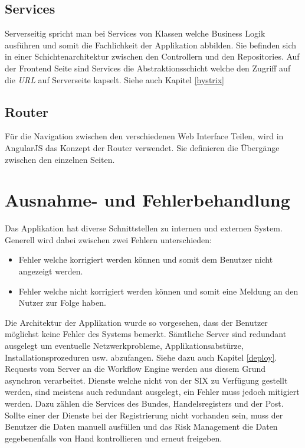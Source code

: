 \subsection{Services}

Serverseitig spricht man bei Services von Klassen welche Business Logik ausführen und somit die Fachlichkeit der Applikation abbilden. Sie befinden sich in einer Schichtenarchitektur zwischen den Controllern und den Repositories. Auf der Frontend Seite sind Services die Abstraktionsschicht welche den Zugriff auf die \textit{\gls{URL}} auf Serverseite kapselt. Siehe auch Kapitel \ref{hystrix}

\subsection{Router}

Für die Navigation zwischen den verschiedenen Web Interface Teilen, wird in AngularJS das Konzept der Router verwendet. Sie definieren die Übergänge zwischen den einzelnen Seiten.
\newpage
\section{Ausnahme- und Fehlerbehandlung}

Das Applikation hat diverse Schnittstellen zu internen und externen System. Generell wird dabei zwischen zwei Fehlern unterschieden:
\begin{itemize}
	\item Fehler welche korrigiert werden können und somit dem Benutzer nicht angezeigt werden.
	\item Fehler welche nicht korrigiert werden können und somit eine Meldung an den Nutzer zur Folge haben.
\end{itemize}
Die Architektur der Applikation wurde so vorgesehen, dass der Benutzer möglichst keine Fehler des Systems bemerkt. Sämtliche Server sind redundant ausgelegt um eventuelle Netzwerkprobleme, Applikationsabstürze, Installationsprozeduren usw. abzufangen. Siehe dazu auch Kapitel \ref{deploy}. Requests vom Server an die Workflow Engine werden aus diesem Grund asynchron verarbeitet.\newline
Dienste welche nicht von der SIX zu Verfügung gestellt werden, sind meistens auch redundant ausgelegt, ein Fehler muss jedoch mitigiert werden. Dazu zählen die Services des Bundes, Handelsregisters und der Post. Sollte einer der Dienste bei der Registrierung nicht vorhanden sein, muss der Benutzer die Daten manuell ausfüllen und das Risk Management die Daten gegebenenfalls von Hand kontrollieren und erneut freigeben.

